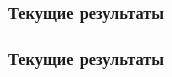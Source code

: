 \documentclass{beamer}
\begin{document}
\begin{frame}\frametitle{Текущие результаты}
    
    \begin{figure}[H]
    \end{figure} 
    
\end{frame}



\begin{frame}\frametitle{Текущие результаты}
    
    \begin{figure}[H]
    \end{figure} 
    
\end{frame}
\end{document}
